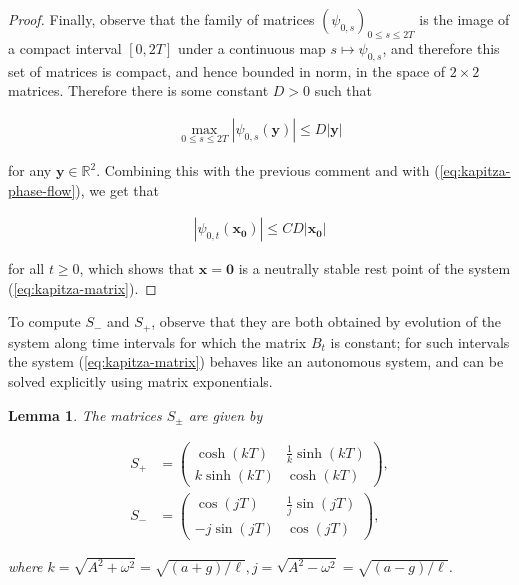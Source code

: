 \documentclass[11pt]{report}
\newcommand{\R}{\mathbb{R}}
\theoremstyle{plain}
\newtheorem{lem}[thm]{Lemma}
\theoremstyle{definition}
\begin{document}
\begin{proof}
Finally, observe that the family of matrices
$(\psi_{0,s})_{0\le s\le 2T}$ is the image of a
compact interval $[0,2T]$ under a continuous map
$s\mapsto \psi_{0,s}$, and therefore this set of
matrices is compact, and hence bounded in norm, in the
space of $2\times 2$ matrices. Therefore there is
some constant $D>0$ such that

\begin{align*}
\max_{0\le s\le 2T} |\psi_{0,s}(\mathbf{y}) | \le D |\mathbf{y}|
\end{align*}

for any $\mathbf{y}\in\R^2$. Combining this with the
previous comment and with (\ref{eq:kapitza-phase-flow}),
we get that

\begin{align*}
|\psi_{0,t} (\mathbf{x_0})| \le CD |\mathbf{x_0}|
\end{align*}

for all $t\ge 0$, which shows that
$\mathbf{x}=\mathbf{0}$ is a neutrally stable rest
point of the system (\ref{eq:kapitza-matrix}).
\end{proof}

To compute $S_-$ and $S_+$, observe that they are
both obtained by evolution of the system along time
intervals for which the matrix $B_t$ is constant; for
such intervals the system (\ref{eq:kapitza-matrix})
behaves like an autonomous system, and can be solved
explicitly using matrix exponentials.

\begin{lem}
The matrices $S_\pm$ are given by

\begin{equation*} \tag{42}\label{eq:kapitza-mat-exp}
\begin{split}
S_+ &= \left(\begin{array}{cc}
\cosh\left(kT\right) & \frac{1}{k}\sinh\left(kT\right)
\\[5pt]
k\sinh\left(kT\right) & \cosh\left(kT\right)
\end{array}\right),
\\[3pt]
S_- &= \left(\begin{array}{cc}
\cos\left(jT\right) & \frac{1}{j}\sin\left(jT\right)
\\[5pt]
-j\sin\left(jT\right) & \cos\left(jT\right)
\end{array}\right),
\end{split}
\end{equation*}

where
$k=\sqrt{A^2+\omega^2}=\sqrt{(a+g)/\ell},
j=\sqrt{A^2-\omega^2}=\sqrt{(a-g)/\ell}$.
\end{lem}
\end{document}
